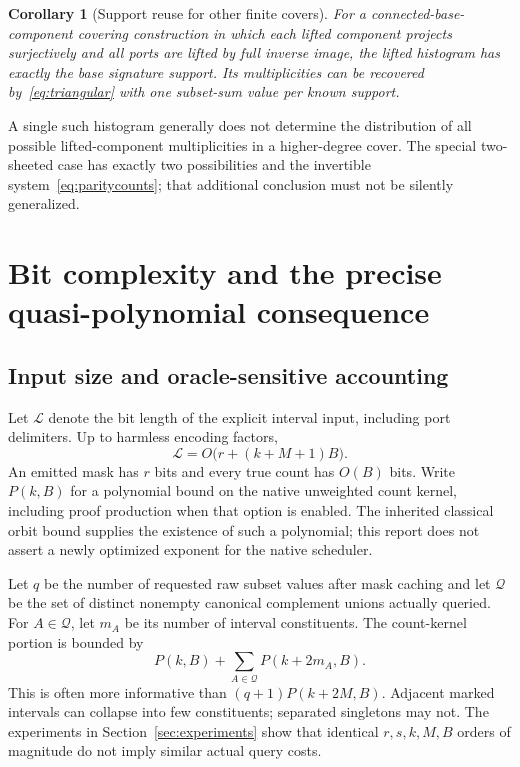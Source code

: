 \documentclass[11pt,letterpaper]{article}
\newtheorem{corollary}[theorem]{Corollary}
\theoremstyle{definition}\newtheorem{definition}[theorem]{Definition}
\theoremstyle{remark}\newtheorem{remark}[theorem]{Remark}
\newcommand{\calQ}{\mathcal{Q}}
\begin{document}
\begin{corollary}[Support reuse for other finite covers]
For a connected-base-component covering construction in which each lifted component projects surjectively and all ports are lifted by full inverse image, the lifted histogram has exactly the base signature support. Its multiplicities can be recovered by~\eqref{eq:triangular} with one subset-sum value per known support.
\end{corollary}

A single such histogram generally does not determine the distribution of all possible lifted-component multiplicities in a higher-degree cover. The special two-sheeted case has exactly two possibilities and the invertible system~\eqref{eq:paritycounts}; that additional conclusion must not be silently generalized.

\section{Bit complexity and the precise quasi-polynomial consequence}
\label{sec:cost}

\subsection{Input size and oracle-sensitive accounting}

Let $\mathcal L$ denote the bit length of the explicit interval input, including port delimiters. Up to harmless encoding factors,
\[
\mathcal L=O\bigl(r+(k+M+1)B\bigr).
\]
An emitted mask has $r$ bits and every true count has $O(B)$ bits. Write $P(k,B)$ for a polynomial bound on the native unweighted count kernel, including proof production when that option is enabled. The inherited classical orbit bound supplies the existence of such a polynomial; this report does not assert a newly optimized exponent for the native scheduler.

Let $q$ be the number of requested raw subset values after mask caching and let $\calQ$ be the set of distinct nonempty canonical complement unions actually queried. For $A\in\calQ$, let $m_A$ be its number of interval constituents. The count-kernel portion is bounded by
\begin{equation}
P(k,B)+\sum_{A\in\calQ}P(k+2m_A,B).
\label{eq:shapecost}
\end{equation}
This is often more informative than $(q+1)P(k+2M,B)$. Adjacent marked intervals can collapse into few constituents; separated singletons may not. The experiments in Section~\ref{sec:experiments} show that identical $r,s,k,M,B$ orders of magnitude do not imply similar actual query costs.
\end{document}
